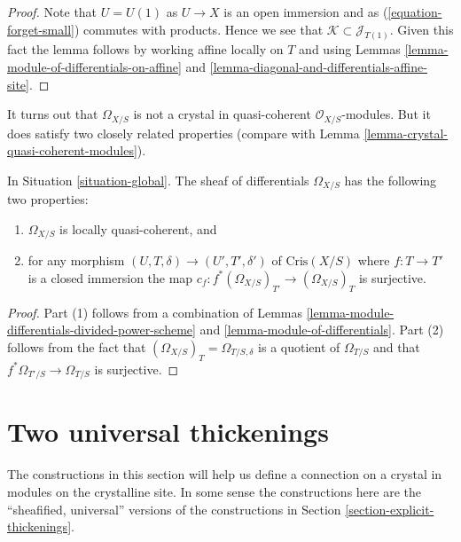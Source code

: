 \begin{proof}
Note that $U = U(1)$ as $U \to X$ is an open immersion and as
(\ref{equation-forget-small}) commutes with products. Hence we see that
$\mathcal{K} \subset \mathcal{J}_{T(1)}$. Given this fact the lemma follows
by working affine locally on $T$ and using
Lemmas \ref{lemma-module-of-differentials-on-affine} and
\ref{lemma-diagonal-and-differentials-affine-site}.
\end{proof}

\noindent
It turns out that $\Omega_{X/S}$ is not a crystal in quasi-coherent
$\mathcal{O}_{X/S}$-modules. But it does satisfy two closely
related properties (compare with
Lemma \ref{lemma-crystal-quasi-coherent-modules}).

\begin{lemma}
\label{lemma-omega-locally-quasi-coherent}
In Situation \ref{situation-global}.
The sheaf of differentials $\Omega_{X/S}$ has the following two
properties:
\begin{enumerate}
\item $\Omega_{X/S}$ is locally quasi-coherent, and
\item for any morphism $(U, T, \delta) \to (U', T', \delta')$
of $\text{Cris}(X/S)$ where $f : T \to T'$ is a closed immersion
the map $c_f : f^*(\Omega_{X/S})_{T'} \to (\Omega_{X/S})_T$ is surjective.
\end{enumerate}
\end{lemma}

\begin{proof}
Part (1) follows from a combination of
Lemmas \ref{lemma-module-differentials-divided-power-scheme} and
\ref{lemma-module-of-differentials}.
Part (2) follows from the fact that
$(\Omega_{X/S})_T = \Omega_{T/S, \delta}$
is a quotient of $\Omega_{T/S}$ and that $f^*\Omega_{T'/S} \to \Omega_{T/S}$
is surjective.
\end{proof}







\section{Two universal thickenings}
\label{section-universal-thickenings}

\noindent
The constructions in this section will help us define a connection on
a crystal in modules on the crystalline site. In some sense the constructions
here are the ``sheafified, universal'' versions of the constructions in
Section \ref{section-explicit-thickenings}.

